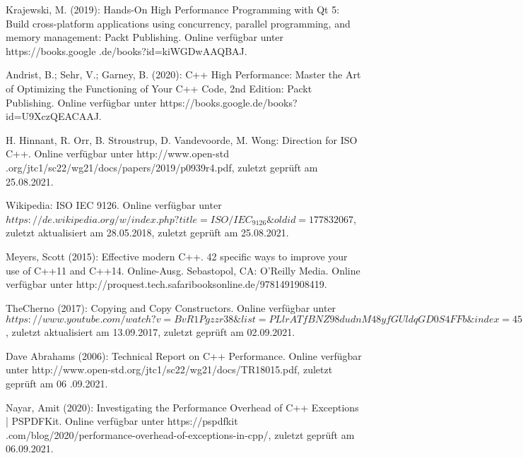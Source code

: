 \begin{thebibliography}{00}
     Krajewski, M. (2019): Hands-On High Performance Programming with Qt 5:
	Build cross-platform applications using concurrency, parallel programming, and memory
	management: Packt Publishing. Online verfügbar unter https://books.google
	.de/books?id=kiWGDwAAQBAJ.

     Andrist, B.; Sehr, V.; Garney, B. (2020): C++ High Performance: Master
	the Art of Optimizing the Functioning of Your C++ Code, 2nd Edition: Packt Publishing. Online
	verfügbar unter https://books.google.de/books?id=U9XczQEACAAJ.

     H. Hinnant, R. Orr, B. Stroustrup, D. Vandevoorde, M. Wong: Direction for
	ISO C++. Online verfügbar unter http://www.open-std
	.org/jtc1/sc22/wg21/docs/papers/2019/p0939r4.pdf, zuletzt geprüft am 25.08.2021.

     Wikipedia: ISO IEC 9126. Online verfügbar unter $https://de.wikipedia
	.org/w/index.php?title=ISO/IEC_9126\&oldid=177832067$, zuletzt aktualisiert am 28.05.2018,
	zuletzt geprüft am 25.08.2021.

     Meyers, Scott (2015): Effective modern C++. 42 specific ways to
	improve your use of C++11 and C++14. Online-Ausg. Sebastopol, CA: O'Reilly Media. Online
	verfügbar unter http://proquest.tech.safaribooksonline.de/9781491908419.

     TheCherno (2017): Copying and Copy Constructors. Online verfügbar unter
	$https://www.youtube.com/watch?v=BvR1Pgzzr38\&list=PLlrATfBNZ98dudnM48yfGUldqGD0S4FFb\&index
	=45$,  zuletzt aktualisiert am 13.09.2017, zuletzt geprüft am 02.09.2021.

     Dave Abrahams (2006): Technical Report on C++ Performance. Online
	verfügbar unter http://www.open-std.org/jtc1/sc22/wg21/docs/TR18015.pdf, zuletzt geprüft am 06
	.09.2021.

     Nayar, Amit (2020): Investigating the Performance Overhead of
	C++ Exceptions | PSPDFKit. Online verfügbar unter https://pspdfkit
	.com/blog/2020/performance-overhead-of-exceptions-in-cpp/, zuletzt geprüft am 06.09.2021.

\end{thebibliography}